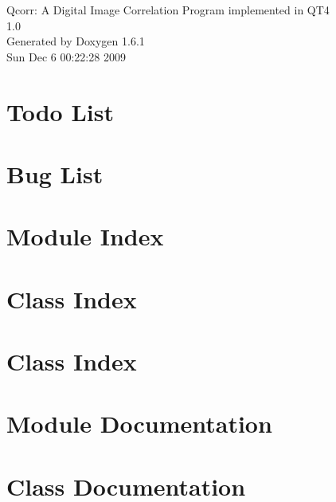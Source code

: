\documentclass[a4paper]{book}
\begin{document}
\hypersetup{pageanchor=false}
\begin{titlepage}
\vspace*{7cm}
\begin{center}
{\Large Qcorr: A Digital Image Correlation Program implemented in QT4 \\[1ex]\large 1.0 }\\
\vspace*{1cm}
{\large Generated by Doxygen 1.6.1}\\
\vspace*{0.5cm}
{\small Sun Dec 6 00:22:28 2009}\\
\end{center}
\end{titlepage}
\clearemptydoublepage
{}
\tableofcontents
\clearemptydoublepage
{}
\hypersetup{pageanchor=true}
\chapter{Todo List}
\label{todo}
\hypertarget{todo}{}

\chapter{Bug List}
\label{bug}
\hypertarget{bug}{}

\chapter{Module Index}

\chapter{Class Index}

\chapter{Class Index}

\chapter{Module Documentation}

\chapter{Class Documentation}














\printindex
\end{document}
